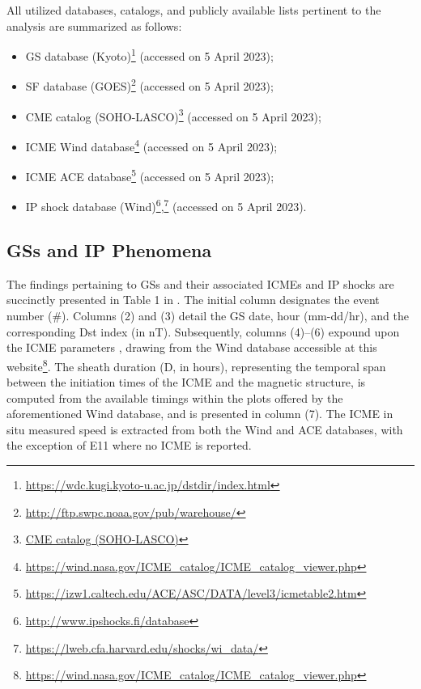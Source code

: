 All utilized databases, catalogs, and publicly available lists pertinent to the analysis are summarized as follows:

\begin{itemize}
	\item GS database (Kyoto)\footnote{\url{https://wdc.kugi.kyoto-u.ac.jp/dstdir/index.html}} (accessed on 5 April 2023);
	\item SF database (GOES)\footnote{\url{http://ftp.swpc.noaa.gov/pub/warehouse/}} (accessed on 5 April 2023);
	\item CME catalog (SOHO-LASCO)\footnote{\url{CME catalog (SOHO-LASCO)}} (accessed on 5 April 2023);
	\item ICME Wind database\footnote{\url{https://wind.nasa.gov/ICME_catalog/ICME_catalog_viewer.php}} (accessed on 5 April 2023);
	\item ICME ACE database\footnote{\url{https://izw1.caltech.edu/ACE/ASC/DATA/level3/icmetable2.htm}} (accessed on 5 April 2023);
	\item IP shock database (Wind)\footnote{\url{http://www.ipshocks.fi/database}},\footnote{\url{https://lweb.cfa.harvard.edu/shocks/wi_data/}} (accessed on 5 April 2023).
\end{itemize}

\subsection{GSs and IP Phenomena}
The findings pertaining to GSs and their associated ICMEs and IP shocks are succinctly presented in Table 1 in \citet{miteva_2023}. The initial column designates the event number (\#). Columns (2) and (3) detail the GS date, hour (mm-dd/hr), and the corresponding Dst index (in nT). Subsequently, columns (4)–(6) expound upon the ICME parameters \citep{nieves_2018}, drawing from the Wind database accessible at this website\footnote{\url{https://wind.nasa.gov/ICME_catalog/ICME_catalog_viewer.php}}. The sheath duration (D, in hours), representing the temporal span between the initiation times of the ICME and the magnetic structure, is computed from the available timings within the plots offered by the aforementioned Wind database, and is presented in column (7). The ICME in situ measured speed is extracted from both the Wind and ACE databases, with the exception of E11 where no ICME is reported.

